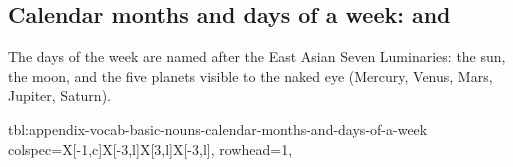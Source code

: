 \documentclass[../nihongo-gakushuu-kyouzai-supplementary.tex]{subfiles}
\begin{document}
\subsection{Calendar months and days of a week:  and }
The days of the week are named after the East Asian Seven Luminaries: the sun, the moon, and the five planets visible to the naked eye (Mercury, Venus, Mars, Jupiter, Saturn).

{tbl:appendix-vocab-basic-nouns-calendar-months-and-days-of-a-week}  %
{}  %
{
    colspec={X[-1,c]X[-3,l]X[3,l]X[-3,l]},
    rowhead=1,
}  %
\end{document}
